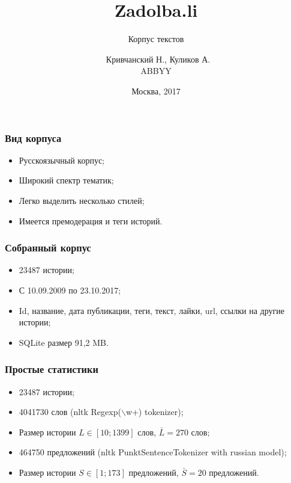 \documentclass[14pt]{beamer}
\title{Zadolba.li}
\subtitle{\footnotesize{Корпус текстов}}
\author{\small{%
		~Кривчанский Н., Куликов А.}\\%
	\vspace{30pt}%
	ABBYY%
	\vspace{20pt}%
}
\date{\small{Москва, 2017}}
\begin{document}
	
	\maketitle

\begin{frame}[fragile]
	
	\frametitle{Вид корпуса}
	
	\begin{itemize}
		\item Русскоязычный корпус;
		\item Широкий спектр тематик;
		\item Легко выделить несколько стилей;
		\item Имеется премодерация и теги историй.
	\end{itemize}

\end{frame}

\begin{frame}[fragile]
	
	\frametitle{Собранный корпус}
	
	\begin{itemize}
		\item 23487 истории;
		\item С 10.09.2009 по 23.10.2017;
		\item Id, название, дата публикации, теги, текст, лайки, url, ссылки на другие истории;
		\item SQLite размер 91,2 MB.
	\end{itemize}
	
\end{frame}

\begin{frame}[fragile]
	
	\frametitle{Простые статистики}
	
	\begin{itemize}
		\item 23487 истории;
		\item 4041730 слов (nltk Regexp($\backslash$w+) tokenizer);
		\item Размер истории $L \in [10; 1399]$ слов, $\bar L = 270$ слов;
		\item 464750 предложений (nltk PunktSentenceTokenizer with russian model);
		\item Размер истории $S \in [1; 173]$ предложений, $\bar S = 20$ предложений.
	\end{itemize}
	
\end{frame}
\end{document}
